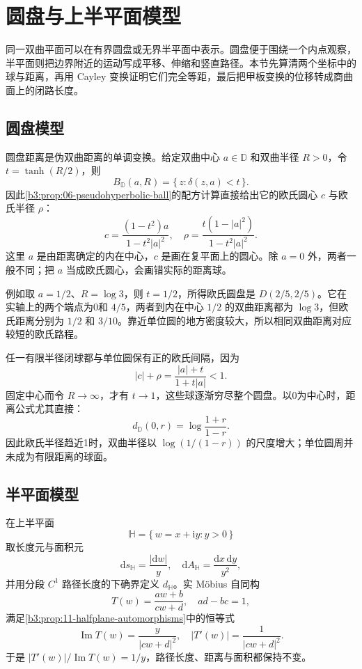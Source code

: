 \section{圆盘与上半平面模型}
\label{b3:sec:1303}

同一双曲平面可以在有界圆盘或无界半平面中表示。圆盘便于围绕一个内点观察，半平面则把边界附近的运动写成平移、伸缩和竖直路径。本节先算清两个坐标中的球与距离，再用 Cayley 变换证明它们完全等距，最后把甲板变换的位移转成商曲面上的闭路长度。

\subsection{圆盘模型}
\label{b3:subsec:130301}

圆盘距离是伪双曲距离的单调变换。给定双曲中心 \(a\in\mathbb D\) 和双曲半径 \(R>0\)，令 \(t=\tanh(R/2)\)，则
\[
 B_{\mathbb D}(a,R)=\{\,z:\delta(z,a)<t\,\}.
\]
因此\cref{b3:prop:06-pseudohyperbolic-ball}的配方计算直接给出它的欧氏圆心 \(c\) 与欧氏半径 \(\rho\)：
\[
 c=\frac{(1-t^2)a}{1-t^2|a|^2},\quad
 \rho=\frac{t(1-|a|^2)}{1-t^2|a|^2}.
\]
这里 \(a\) 是由距离确定的内在中心，\(c\) 是画在复平面上的圆心。除 \(a=0\) 外，两者一般不同；把 \(a\) 当成欧氏圆心，会画错实际的距离球。

\ProseParagraphBreak
例如取 \(a=1/2\)、\(R=\log3\)，则 \(t=1/2\)，所得欧氏圆盘是 \(D(2/5,2/5)\)。它在实轴上的两个端点为0和 \(4/5\)，两者到内在中心 \(1/2\) 的双曲距离都为 \(\log3\)，但欧氏距离分别为 \(1/2\) 和 \(3/10\)。靠近单位圆的地方密度较大，所以相同双曲距离对应较短的欧氏路程。

\ProseParagraphBreak
任一有限半径闭球都与单位圆保有正的欧氏间隔，因为
\[
 |c|+\rho=\frac{|a|+t}{1+t|a|}<1.
\]
固定中心而令 \(R\to\infty\)，才有 \(t\to1\)，这些球逐渐穷尽整个圆盘。以0为中心时，距离公式尤其直接：
\[
 d_{\mathbb D}(0,r)=\log\frac{1+r}{1-r}.
\]
因此欧氏半径趋近1时，双曲半径以 \(\log(1/(1-r))\) 的尺度增大；单位圆周并未成为有限距离的球面。

\subsection{半平面模型}
\label{b3:subsec:130302}

在上半平面
\[
 \mathbb H=\{\,w=x+\mathrm iy:y>0\,\}
\]
取长度元与面积元
\[
 \mathrm ds_{\mathbb H}=\frac{|\mathrm dw|}{y},\quad
 \mathrm dA_{\mathbb H}=\frac{\mathrm dx\,\mathrm dy}{y^2},
\]
并用分段 \(C^1\) 路径长度的下确界定义 \(d_{\mathbb H}\)。实 Möbius 自同构
\[
 T(w)=\frac{aw+b}{cw+d},\quad ad-bc=1,
\]
满足\cref{b3:prop:11-halfplane-automorphisms}中的恒等式
\[
 \operatorname{Im}T(w)=\frac{y}{|cw+d|^2},\quad
 |T'(w)|=\frac1{|cw+d|^2}.
\]
于是 \(|T'(w)|/\operatorname{Im}T(w)=1/y\)，路径长度、距离与面积都保持不变。

